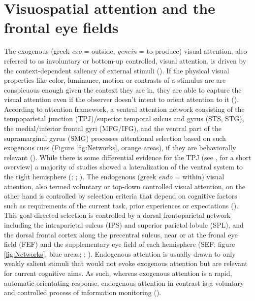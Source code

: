 \documentclass[a4paper, 12pt]{scrreprt}
\begin{document}
\pagebreak


\section{Visuospatial attention and the frontal eye fields}\label{section:visualattention}
The exogenous (greek \textit{exo} = outside, \textit{genein} = to produce) visual attention, also referred to as involuntary or bottom-up controlled, visual attention, is driven by the context-dependent saliency of external stimuli (\cite{itti2001computational}). If the physical visual properties like color, luminance, motion or contrasts of a stimulus are are conspicuous enough given the context they are in, they are able to capture the visual attention even if the observer doesn’t intent to orient attention to it (\cite{chica2013two}). According to \textcite{corbetta2002control} attention framework, a ventral attention network consisting of the tempoparietal junction (TPJ)/superior temporal sulcus and gyrus (STS, STG), the medial/inferior frontal gyri (MFG/IFG), and the ventral part of the supramarginal gyrus (SMG) processes attentional selection based on such exogenous cues (Figure \ref{fig:Networks}, orange areas), if they are behaviorally relevant (\cite{downar2000multimodal}). While there is some differential evidence for the TPJ (see \textcite{vossel2014dorsal}, for a short overview) a majority of studies showed a lateralization of the ventral system to the right hemisphere (\cite{corbetta2002control}; \cite{fox2006spontaneous}; \cite{corbetta2008reorienting}). \newline 
The endogenous (greek \textit{endo} = within) visual attention, also termed voluntary or top-down controlled visual attention, on the other hand is controlled by selection criteria that depend on cognitive factors such as requirements of the current task, prior experiences or expectations (\cite{itti2001computational}). This goal-directed selection is controlled by a dorsal frontoparietal network including the intraparietal sulcus (IPS) and superior parietal lobule (SPL), and the dorsal frontal cortex along the precentral sulcus, near or at the fronal eye field (FEF) and the supplementary eye field of each hemisphere (SEF; figure \ref{fig:Networks}, blue areas; \cite{corbetta2002control}; \cite{corbetta2008reorienting}). Endogenous attention is usually drawn to only weakly salient stimuli that would not evoke exogenous attention but are relevant for current cognitive aims. As such, whereas exogenous attention is a rapid, automatic orientating response, endogenous attention in contrast is a voluntary and controlled process of information monitoring (\cite{carrasco2011visual}).
\end{document}
